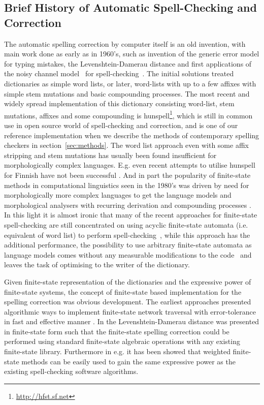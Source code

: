 \documentclass[a4paper,12pt]{article}
\begin{document}
\subsection{Brief History of Automatic Spell-Checking and Correction}
\label{subsec:background}

The automatic spelling correction by computer itself is an old invention, with
main work done as early as in 1960's, such as invention of the generic error
model for typing mistakes, the Levenshtein-Damerau distance
\cite[]{levenshtein/1966,damerau/1964} and first applications of the noisy
channel model~\cite[]{shannon/1948} for spell-checking~\cite[]{raviv/1967}.
The initial solutions treated dictionaries as simple word lists, or later,
word-lists with up to a few affixes with simple stem mutations and basic
compounding processes. The most recent and widely spread implementation of this
dictionary consisting word-list, stem mutations, affixes and some compounding
is hunspell\footnote{\url{http://hfst.sf.net}}, which is still in common use
in open source world of spell-checking and correction, and is one of
our reference implementation when we describe the methods of contemporary
spelling checkers in section~\ref{sec:methods}. The word list approach even
with some affix stripping and stem mutations has usually been found
insufficient for morphologically complex languages.  E.g. even recent attempts
to utilise hunspell for Finnish have not been successful
\cite[]{pitkanen/2006}. And in part the popularity of finite-state methods in
computational linguistics seen in the 1980's was driven by need for
morphologically more complex languages to get the language models and
morphological analysers with recurring derivation and compounding processes
\cite[]{beesley2004morphological}.  In this light it is almost ironic that many
of the recent approaches for finite-state spell-checking are still concentrated
on using acyclic finite-state automata (i.e. equivalent of word list) to
perform spell-checking~\cite[]{watson2003new,deorowicz2005correcting}, while
this approach has the additional performance, the possibility to use arbitrary
finite-state automata as language models comes without any measurable
modifications to the code~\cite[e.g.][]{pirinen/2010/lrec} and leaves the task
of optimising to the writer of the dictionary.

Given finite-state representation of the dictionaries and the expressive power
of finite-state systems, the concept of finite-state based implementation for
the spelling correction was obvious development. The earliest approaches
presented algorithmic ways to implement finite-state network traversal with
error-tolerance \cite[]{oflazer/1996} in fast and effective manner
\cite[]{agata/2002,hulden/2009}.  In \cite{schulz/2002} the Levenshtein-Damerau
distance was presented in finite-state form such that the finite-state spelling
correction could be performed using standard finite-state algebraic operations
with any existing finite-state library. Furthermore in e.g.
\cite{pirinen/2010/lrec} it has been showed that weighted finite-state methods
can be easily used to gain the same expressive power as the existing
spell-checking software algorithms.
\end{document}
